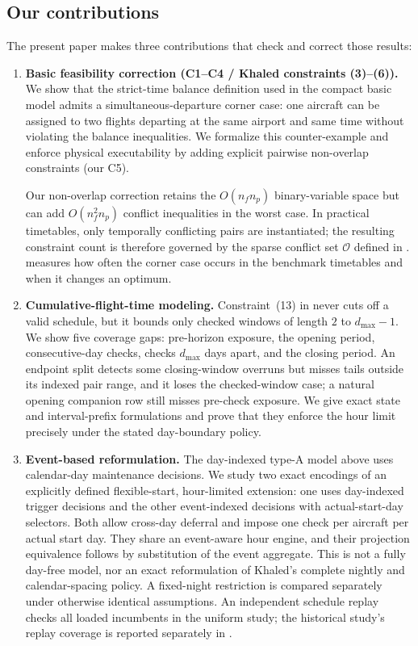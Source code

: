 \subsection*{Our contributions}

The present paper makes three contributions that check and correct
those results:

\begin{enumerate}
\item \textbf{Basic feasibility correction (C1--C4 / Khaled constraints (3)--(6)).}
  We show that the strict-time balance definition used in the compact basic
  model admits a simultaneous-departure corner case: one aircraft can be
  assigned to two flights departing at the same airport and same time without
  violating the balance inequalities.  We formalize this counter-example and
  enforce physical executability by adding explicit pairwise non-overlap
  constraints (our C5).
  
  Our non-overlap correction retains the $O(n_fn_p)$ binary-variable space but
can add $O(n_f^2n_p)$ conflict inequalities in the worst case. In practical
timetables, only temporally conflicting pairs are instantiated; the resulting
constraint count is therefore governed by the sparse conflict set
$\mathcal O$ defined in .  measures
how often the corner case occurs in the benchmark timetables and when it
changes an optimum.


\item \textbf{Cumulative-flight-time modeling.} Constraint~(13) in
  \citet{khaled2018compact} never cuts off a valid schedule, but it bounds
  only checked windows of length $2$ to $d_{\max}-1$. We show five coverage
  gaps: pre-horizon exposure, the opening period, consecutive-day checks,
  checks $d_{\max}$ days apart, and the closing period. An endpoint split
  detects some closing-window overruns but misses tails outside its indexed
  pair range, and it loses the checked-window case; a natural opening
  companion row still misses pre-check exposure. We give
  exact state and interval-prefix formulations and prove that they enforce
  the hour limit precisely under the stated day-boundary policy.

\item \textbf{Event-based reformulation.}  The day-indexed type-A model
  above uses calendar-day maintenance decisions. We study two exact encodings
  of an explicitly defined flexible-start, hour-limited extension: one uses
  day-indexed trigger decisions and the other event-indexed decisions with
  actual-start-day selectors. Both allow cross-day deferral and impose one
  check per aircraft per actual start day. They share an event-aware hour
  engine, and their projection equivalence follows by substitution of the
  event aggregate. This is not a fully day-free model, nor an exact
  reformulation of Khaled's complete nightly and calendar-spacing policy.
  A fixed-night restriction is compared separately under otherwise identical
  assumptions. An independent schedule replay checks all loaded incumbents in
  the uniform study; the historical study's replay coverage is reported
  separately in .
\end{enumerate}

